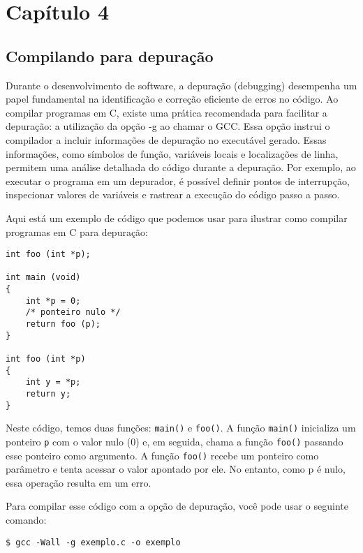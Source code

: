 \chapter{Capítulo 4}

\section{Compilando para depuração}

Durante o desenvolvimento de software, a depuração (debugging) desempenha um papel fundamental na identificação e correção eficiente de erros no código. Ao compilar programas em C, existe uma prática recomendada para facilitar a depuração: a utilização da opção -g ao chamar o GCC. Essa opção instrui o compilador a incluir informações de depuração no executável gerado. Essas informações, como símbolos de função, variáveis locais e localizações de linha, permitem uma análise detalhada do código durante a depuração. Por exemplo, ao executar o programa em um depurador, é possível definir pontos de interrupção, inspecionar valores de variáveis e rastrear a execução do código passo a passo.

Aqui está um exemplo de código que podemos usar para ilustrar como compilar programas em C para depuração:

\begin{scriptsize}
\estiloC
\begin{lstlisting}[title=exemplo.c]
int foo (int *p);

int main (void)
{
    int *p = 0;
    /* ponteiro nulo */
    return foo (p);
}

int foo (int *p)
{
    int y = *p;
    return y;
}
\end{lstlisting}
\end{scriptsize}

Neste código, temos duas funções: \texttt{main()} e \texttt{foo()}. A função \texttt{main()} inicializa um ponteiro \texttt{p} com o valor nulo (0) e, em seguida, chama a função \texttt{foo()} passando esse ponteiro como argumento. A função \texttt{foo()} recebe um ponteiro como parâmetro e tenta acessar o valor apontado por ele. No entanto, como p é nulo, essa operação resulta em um erro.

Para compilar esse código com a opção de depuração, você pode usar o seguinte comando:

\begin{scriptsize}
\estilobash
\begin{lstlisting}
$ gcc -Wall -g exemplo.c -o exemplo
\end{lstlisting}
\end{scriptsize}

